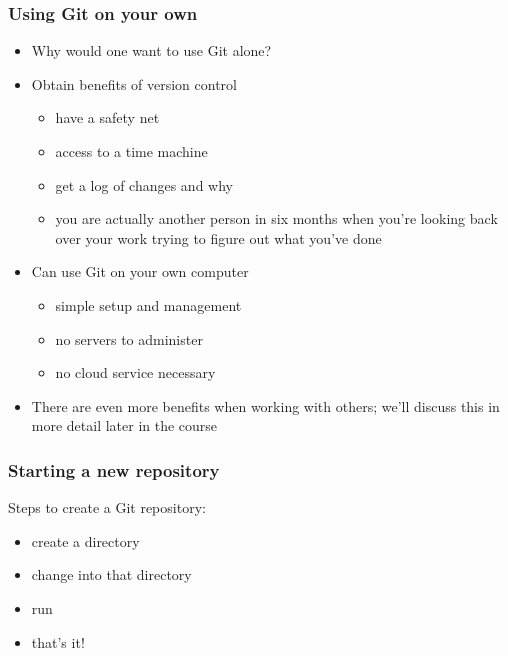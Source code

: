 \documentclass{git_course}
\begin{document}
\begin{frame}
\frametitle{Using Git on your own}
\begin{itemize}
    \item Why would one want to use Git alone?
    \item Obtain benefits of version control
        \begin{itemize}
            \item have a safety net
            \item access to a time machine
            \item get a log of changes and why
            \item you are actually another person in six months when you're
                looking back over your work trying to figure out what you've
                done
        \end{itemize}
    \item Can use Git on your own computer
        \begin{itemize}
            \item simple setup and management
            \item no servers to administer
            \item no cloud service necessary
        \end{itemize}
    \item There are even more benefits when working with others; we'll
        discuss this in more detail later in the course
\end{itemize}
\end{frame}


\begin{frame}
    \frametitle{Starting a new repository}
    Steps to create a Git repository:
    \begin{itemize}
        \item create a directory
        \item change into that directory
        \item run 
        \item that's it!
    \end{itemize}
\end{frame}
\end{document}
